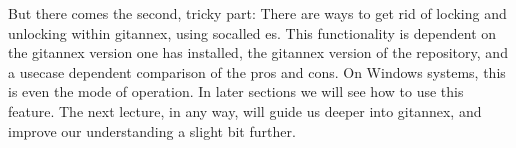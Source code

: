 \ignorespaces 
\sphinxAtStartPar
But there comes the second, tricky part: There are ways to get rid of locking and
unlocking within git\sphinxhyphen{}annex, using so\sphinxhyphen{}called {\hyperref[\detokenize{glossary:term-adjusted-branch}]{}}es.
This functionality is dependent on the git\sphinxhyphen{}annex version one has installed, the git\sphinxhyphen{}annex version of the repository, and a use\sphinxhyphen{}case dependent comparison of the pros and cons.
On Windows systems, this {\hyperref[\detokenize{glossary:term-adjusted-mode}]{}} is even the  mode of operation.
In later sections we will see how to use this feature.
The next lecture, in any way, will guide us deeper into git\sphinxhyphen{}annex, and improve our understanding a slight bit further.

\sphinxstepscope

\ignorespaces 

